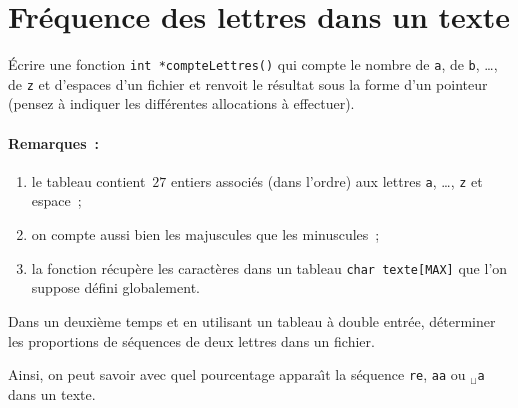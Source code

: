 \section{Fr\'equence des lettres dans un texte}
  \'Ecrire  une fonction  \texttt{int *compteLettres()} qui  compte le
  nombre de   \texttt{a},  de  \texttt{b}, \ldots, de    \texttt{z} et
  d'espaces d'un fichier et renvoit  le r\'esultat sous la forme  d'un
  pointeur  (pensez \`a   indiquer les diff\'erentes   allocations \`a
  effectuer).
  \paragraph{Remarques~:}
  \begin{enumerate}
  \item le tableau contient~$27$ entiers associ\'es (dans l'ordre) aux
    lettres \texttt{a}, \ldots, \texttt{z} et espace~;
  \item on compte aussi bien les majuscules que les minuscules~;
  \item  la fonction r\'ecup\`ere  les   caract\`eres dans un  tableau
    \texttt{char texte[MAX]} que l'on suppose d\'efini globalement.
  \end{enumerate}
  Dans  un deuxi\`eme  temps et   en utilisant  un tableau \`a  double
  entr\'ee,  d\'eterminer  les  proportions  de s\'equences    de deux
  lettres dans un fichier.
  \par
  Ainsi,  on  peut savoir    avec quel pourcentage   appara\^\i{}t  la
  s\'equence \texttt{re}, \texttt{aa} ou $_{\sqcup}$\texttt{a} dans un
  texte.
